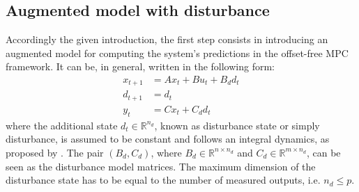 \documentclass[a4paper,12pt,oneside]{book}
\begin{document}
\subsection*{Augmented model with disturbance}
Accordingly the given introduction, the first step consists in introducing an augmented model for computing the system's predictions in the offset-free MPC framework. 
It can be, in general, written in the following form:
\begin{equation}
\begin{aligned}
    x_{t+1} &= A x_t + B u_t + B_d d_t \\
    d_{t+1} &= d_t \\
    y_t &= C x_t + C_d d_t
\end{aligned}
\label{Augmented_model}
\end{equation}
where the additional state $d_t \in \mathbb{R}^{n_d}$, known as disturbance state or simply disturbance, is assumed to be constant and follows an integral dynamics, as proposed by \cite{pannocchia2003disturbance}. 
The pair $(B_d, C_d)$, where $B_d \in \mathbb{R}^{n \times n_d}$ and $C_d \in \mathbb{R}^{m \times n_d}$, can be seen as the disturbance model matrices.
The maximum dimension of the disturbance state has to be equal to the number of measured outputs, i.e. $n_d \leq p$.
\end{document}
